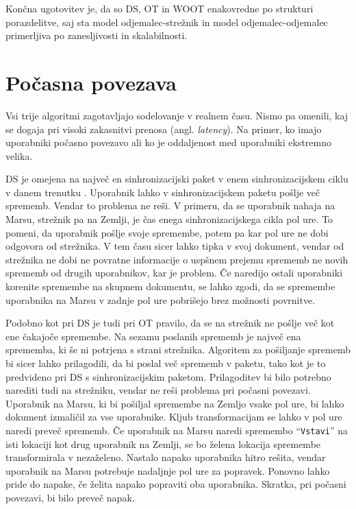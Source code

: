 \documentclass[a4paper, 12pt, twoside]{book}
\begin{document}
Končna ugotovitev je, da so DS, OT in WOOT enakovredne po strukturi porazdelitve, saj sta model odjemalec-strežnik in model odjemalec-odjemalec primerljiva po zanesljivosti in skalabilnosti.

\section{Počasna povezava}

Vsi trije algoritmi zagotavljajo sodelovanje v realnem času. Nismo pa omenili, kaj se dogaja pri visoki zakasnitvi prenosa (angl. \textit{latency}). Na primer, ko imajo uporabniki počasno povezavo ali ko je oddaljenost med uporabniki ekstremno velika.

DS je omejena na največ en sinhronizacijski paket v enem sinhronizacijskem ciklu v danem trenutku \cite{diffsync}. Uporabnik lahko v sinhronizacijskem paketu pošlje več sprememb. Vendar to problema ne reši. V primeru, da se uporabnik nahaja na Marsu, strežnik pa na Zemlji, je čas enega sinhronizacijskega cikla pol ure. To pomeni, da uporabnik pošlje svoje spremembe, potem pa kar pol ure ne dobi odgovora od strežnika. V tem času sicer lahko tipka v svoj dokument, vendar od strežnika ne dobi ne povratne informacije o uspšnem prejemu sprememb ne novih sprememb od drugih uporabnikov, kar je problem. Če naredijo ostali uporabniki korenite spremembe na skupnem dokumentu, se lahko zgodi, da se spremembe uporabnika na Marsu v zadnje pol ure pobrišejo brez možnosti povrnitve.

Podobno kot pri DS je tudi pri OT pravilo, da se na strežnik ne pošlje več kot ene čakajoče spremembe. Na sezamu poslanih sprememb je največ ena sprememba, ki še ni potrjena s strani strežnika. Algoritem za pošiljanje sprememb bi sicer lahko prilagodili, da bi poslal več sprememb v paketu, tako kot je to predvideno pri DS s sinhronizacijskim paketom. Prilagoditev bi bilo potrebno narediti tudi na strežniku, vendar ne reši problema pri počasni povezavi. Uporabnik na Marsu, ki bi pošiljal spremembe na Zemljo vsake pol ure, bi lahko dokument izmaličil za vse uporabnike. Kljub transformacijam se lahko v pol ure naredi preveč sprememb. Če uporabnik na Marsu naredi spremembo “{\tt Vstavi}” na isti lokaciji kot drug uporabnik na Zemlji, se bo želena lokacija spremembe transformirala v nezaželeno. Nastalo napako uporabnika hitro rešita, vendar uporabnik na Marsu potrebuje nadaljnje pol ure za popravek. Ponovno lahko pride do napake, če želita napako popraviti oba uporabnika. Skratka, pri počasni povezavi, bi bilo preveč napak.
\end{document}
